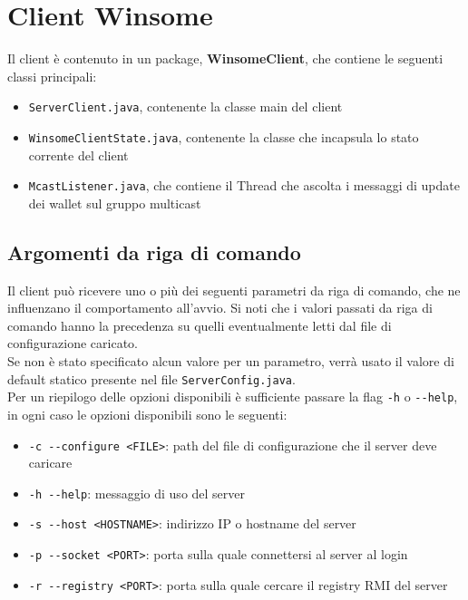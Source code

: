 \section{Client Winsome}
Il client è contenuto in un package, \textbf{WinsomeClient}, che contiene le seguenti classi principali:
\begin{itemize}
	\item \verb|ServerClient.java|, contenente la classe main del client
	\item \verb|WinsomeClientState.java|, contenente la classe che incapsula lo stato corrente del client
	\item \verb|McastListener.java|, che contiene il Thread che ascolta i messaggi di update dei wallet sul gruppo multicast
\end{itemize}

\subsection{Argomenti da riga di comando}
Il client può ricevere uno o più dei seguenti parametri da riga di comando, che ne influenzano il comportamento all'avvio.
Si noti che i valori passati da riga di comando hanno la precedenza su quelli eventualmente letti dal file di configurazione caricato.\\
Se non è stato specificato alcun valore per un parametro, verrà usato il valore di default statico presente nel file \verb|ServerConfig.java|.\\
Per un riepilogo delle opzioni disponibili è sufficiente passare la flag \verb|-h| o \verb|--help|, in ogni caso le opzioni
disponibili sono le seguenti:

\begin{itemize}
	\item \verb|-c --configure <FILE>|: path del file di configurazione che il server deve caricare
	\item \verb|-h --help|: messaggio di uso del server
	\item \verb|-s --host <HOSTNAME>|: indirizzo IP o hostname del server
	\item \verb|-p --socket <PORT>|: porta sulla quale connettersi al server al login
	\item \verb|-r --registry <PORT>|: porta sulla quale cercare il registry RMI del server
\end{itemize}

